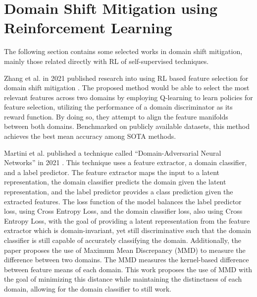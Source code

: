 \section{Domain Shift Mitigation using Reinforcement Learning}

The following section contains some selected works in domain shift mitigation, mainly those related directly with RL of self-supervised techniques.

Zhang et al. in 2021 published research into using RL based feature selection for domain shift mitigation \cite{zhang2021adversarial}.
The proposed method would be able to select the most relevant features across two domains by employing Q-learning to learn policies for feature selection, utilizing the performance of a domain discriminator as its reward function.
By doing so, they attempt to align the feature manifolds between both domains.
Benchmarked on publicly available datasets, this method achieves the best mean accuracy among SOTA methods.

Martini et al. published a technique called ``Domain-Adversarial Neural Networks'' in 2021 \cite{martini2021domain}.
This technique uses a feature extractor, a domain classifier, and a label predictor.
The feature extractor maps the input to a latent representation, the domain classifier predicts the domain given the latent representation, and the label predictor provides a class prediction given the extracted features.
The loss function of the model balances the label predictor loss, using Cross Entropy Loss, and the domain classifier loss, also using Cross Entropy Loss, with the goal of providing a latent representation from the feature extractor which is domain-invariant, yet still discriminative such that the domain classifier is still capable of accurately classifying the domain.
Additionally, the paper proposes the use of Maximum Mean Discrepancy (MMD) to measure the difference between two domains.
The MMD measures the kernel-based difference between feature means of each domain.
This work proposes the use of MMD with the goal of minimizing this distance while maintaining the distinctness of each domain, allowing for the domain classifier to still work.

